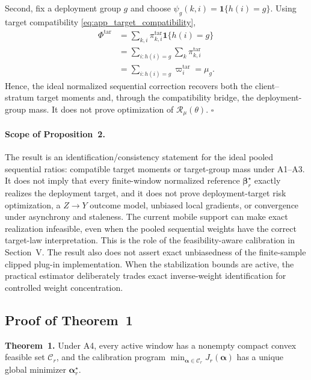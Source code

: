 Second, fix a deployment group $g$ and choose
$\psi_g(k,i)=\mathbf{1}\{h(i)=g\}$.
Using target compatibility
\eqref{eq:app_target_compatibility},
\begin{align}
 \Phi^{\mathrm{tar}}
 &=
 \sum_{k,i}
 \pi^{\mathrm{tar}}_{k,i}
 \mathbf{1}\{h(i)=g\}
 \nonumber\\
 &=
 \sum_{i:h(i)=g}
 \sum_k
 \pi^{\mathrm{tar}}_{k,i}
 \nonumber\\
 &=
 \sum_{i:h(i)=g}
 \varpi_i^{\mathrm{tar}}
 =
 \mu_g.
 \label{eq:app_recover_group}
\end{align}
Hence, the ideal normalized sequential correction recovers both the
client--stratum target moments and, through the compatibility bridge, the
deployment-group mass.  It does not prove optimization of
$\mathcal{R}_{\mu}(\theta)$. \hfill$\square$

\paragraph{Scope of Proposition~2.}
The result is an identification/consistency statement for the ideal pooled
sequential ratios: compatible target moments or target-group mass under
A1--A3.  It does not imply that every finite-window normalized
reference $\boldsymbol\beta_r^\star$ exactly realizes the deployment target,
and it does not prove deployment-target risk optimization, a $Z\!\to\!Y$
outcome model, unbiased local gradients, or convergence under asynchrony
and staleness.
The current mobile support can make exact realization infeasible, even when
the pooled sequential weights have the correct target-law interpretation.  This
is the role of the feasibility-aware calibration in
Section~V.  The result also does not assert exact
unbiasedness of the finite-sample clipped plug-in implementation.  When the
stabilization bounds are active, the practical estimator deliberately trades
exact inverse-weight identification for controlled weight concentration.


\subsection{Proof of Theorem~1}
\label{app:proof_theorem1}

\noindent\textbf{Theorem~1.}
Under A4, every active window has a nonempty compact convex feasible set
$\mathcal{C}_r$, and the calibration program
$\min_{\boldsymbol\alpha\in\mathcal{C}_r}J_r(\boldsymbol\alpha)$
has a unique global minimizer $\boldsymbol\alpha_r^\star$.

